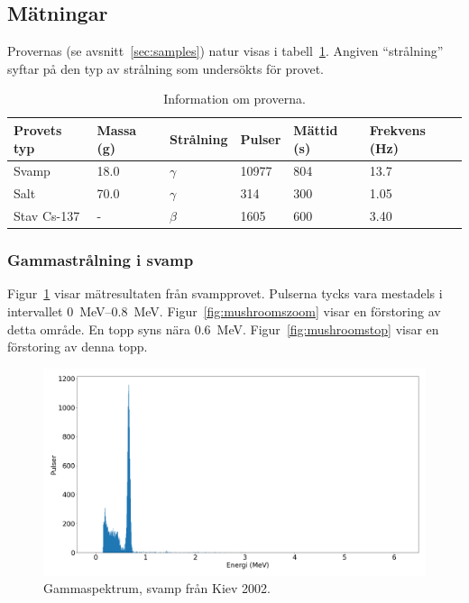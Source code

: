\subsection{Mätningar} \label{sec:measurements}

Provernas (se avsnitt~\ref{sec:samples}) natur visas i
tabell~\ref{tab:samples}. Angiven ``strålning'' syftar på den typ av strålning
som undersökts för provet.

\begin{table}[!hp]
    \begin{tabular}{|l|l|l|l|l|l|}
    \hline
    Provets typ & Massa (\unit{g}) & Strålning & Pulser      & Mättid (\unit{s}) & Frekvens (\unit{\Hz}) \\
    \hline
    Svamp       & \num{18.0}       & $\gamma$  & \num{10977} & \num{804}         & \num{13.7}            \\
    \hline
    Salt        & \num{70.0}       & $\gamma$  & \num{314}   & \num{300}         & \num{1.05}            \\
    \hline
    Stav Cs-137 & -                & $\beta$   & \num{1605}  & \num{600}         & \num{3.40}            \\
    \hline
    \end{tabular}
    \caption{Information om proverna.}
    \label{tab:samples}
\end{table}

\subsubsection{Gammastrålning i svamp}

Figur~\ref{fig:mushrooms} visar mätresultaten från svampprovet. Pulserna tycks
vara mestadels i intervallet \qtyrange{0}{0.8}{\MeV}.
Figur~\ref{fig:mushroomszoom} visar en förstoring av detta område. En topp syns
nära \qty{0.6}{\MeV}. Figur~\ref{fig:mushroomstop} visar en förstoring av denna
topp.

\begin{figure}[!hp]
    \centering
    \includegraphics[width=\textwidth, keepaspectratio]{../images/mushrooms.png}
    \caption{Gammaspektrum, svamp från Kiev 2002.}
    \label{fig:mushrooms}
\end{figure}

